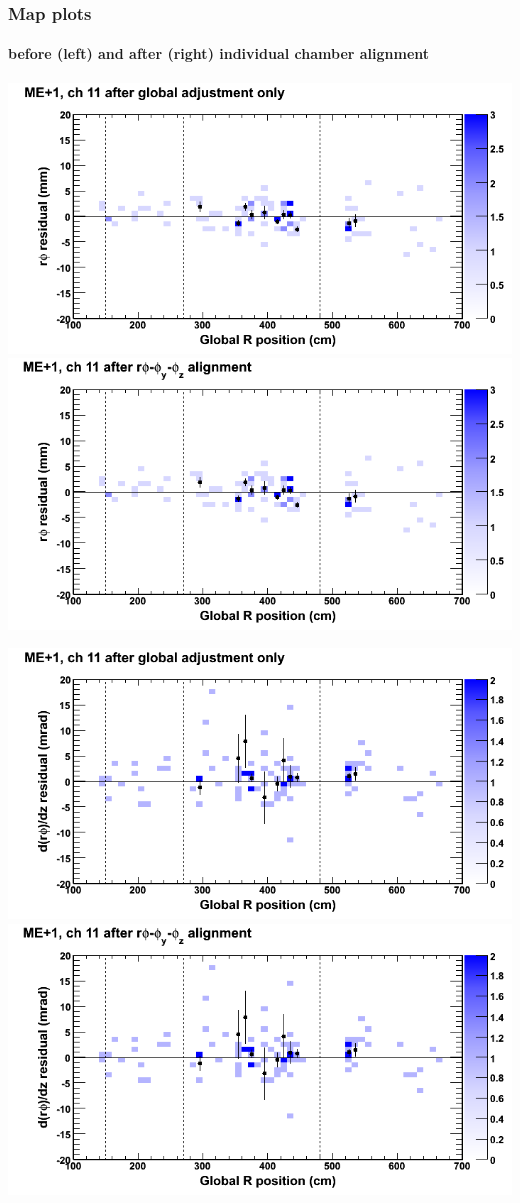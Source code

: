 \documentclass[compress]{beamer}
\begin{document}
\begin{frame}
\frametitle{Map plots}
\framesubtitle{before (left) and after (right) individual chamber alignment}
\includegraphics[width=0.5\linewidth]{ringmapplots_3dof/before_CSCvsr_mep1ch11_x.png} \includegraphics[width=0.5\linewidth]{ringmapplots_3dof/after_CSCvsr_mep1ch11_x.png}

\includegraphics[width=0.5\linewidth]{ringmapplots_3dof/before_CSCvsr_mep1ch11_dxdz.png} \includegraphics[width=0.5\linewidth]{ringmapplots_3dof/after_CSCvsr_mep1ch11_dxdz.png}
\end{frame}
\end{document}

